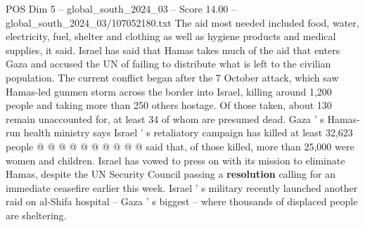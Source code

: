 \begin{textsample}{POS Dim 5 – global\_south\_2024\_03 – Score 14.00 – global\_south\_2024\_03/107052180.txt}
The aid most needed included food, water, electricity, fuel, shelter and clothing as well as hygiene products and medical supplies, it said.
Israel has said that Hamas takes much of the aid that enters Gaza and accused the UN of failing to distribute what is left to the civilian population.
The current conflict began after the 7 October attack, which saw Hamas-led gunmen storm across the border into Israel, killing around 1,200 people and taking more than 250 others hostage.
Of those taken, about 130 remain unaccounted for, at least 34 of whom are presumed dead.
Gaza ' s Hamas-run health ministry says Israel ' s retaliatory campaign has killed at least 32,623 people @ @ @ @ @ @ @ @ @ @ said that, of those killed, more than 25,000 were women and children.
Israel has vowed to press on with its mission to eliminate Hamas, despite the UN Security Council passing a \textbf{resolution} calling for an immediate ceasefire earlier this week.
Israel ' s military recently launched another raid on al-Shifa hospital -- Gaza ' s biggest -- where thousands of displaced people are sheltering.

\end{textsample}
